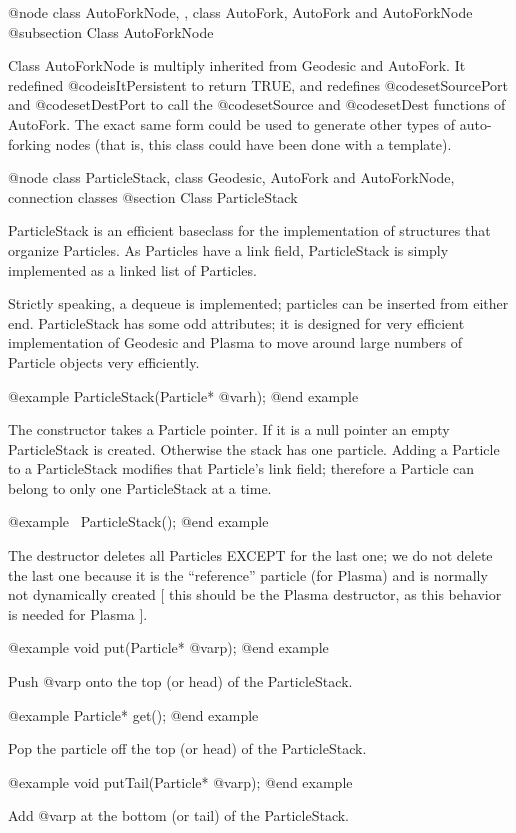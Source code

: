 @node class AutoForkNode,  , class AutoFork, AutoFork and AutoForkNode
@subsection Class AutoForkNode

Class AutoForkNode is multiply inherited from Geodesic and AutoFork.
It redefined @code{isItPersistent} to return TRUE, and redefines
@code{setSourcePort} and @code{setDestPort} to call the
@code{setSource} and @code{setDest} functions of AutoFork.
The exact same form could be used to generate other types of
auto-forking nodes (that is, this class could have been done with
a template).

@node class ParticleStack, class Geodesic, AutoFork and AutoForkNode, connection classes
@section Class ParticleStack

ParticleStack is an efficient baseclass for the implementation of
structures that organize Particles.  As Particles have a link field,
ParticleStack is simply implemented as a linked list of Particles.

Strictly speaking, a dequeue is implemented; particles can be inserted
from either end.  ParticleStack has some odd attributes; it is designed
for very efficient implementation of Geodesic and Plasma to move around
large numbers of Particle objects very efficiently.

@example
ParticleStack(Particle* @var{h});
@end example

The constructor takes a Particle pointer.  If it is a null pointer an
empty ParticleStack is created.  Otherwise the stack has one particle.
Adding a Particle to a ParticleStack modifies that Particle's link
field; therefore a Particle can belong to only one ParticleStack at a
time.

@example
~ParticleStack();
@end example

The destructor deletes all Particles EXCEPT for the last one; we do
not delete the last one because it is the ``reference'' particle (for
Plasma) and is normally not dynamically created [ this should be the
Plasma destructor, as this behavior is needed for Plasma ].

@example
void put(Particle* @var{p});
@end example

Push @var{p} onto the top (or head) of the ParticleStack.

@example
Particle* get();
@end example

Pop the particle off the top (or head) of the ParticleStack.

@example
void putTail(Particle* @var{p});
@end example

Add @var{p} at the bottom (or tail) of the ParticleStack.

